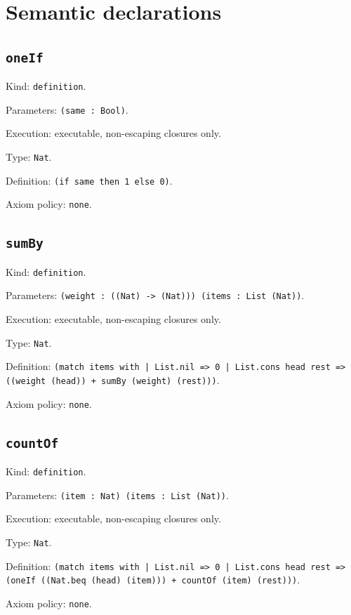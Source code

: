 \documentclass[11pt]{article}
\begin{document}
\section*{Semantic declarations}
\subsection*{\texttt{oneIf}}
\noindent Kind: \texttt{definition}.\par
\noindent Parameters: \texttt{(same : Bool)}.\par
\noindent Execution: executable, non-escaping closures only.\par
\noindent Type: \texttt{Nat}.\par
\noindent Definition: \texttt{(if same then 1 else 0)}.\par
\noindent Axiom policy: \texttt{none}.\par
\subsection*{\texttt{sumBy}}
\noindent Kind: \texttt{definition}.\par
\noindent Parameters: \texttt{(weight : ((Nat) -> (Nat))) (items : List (Nat))}.\par
\noindent Execution: executable, non-escaping closures only.\par
\noindent Type: \texttt{Nat}.\par
\noindent Definition: \texttt{(match items with | List.nil => 0 | List.cons head rest => ((weight (head)) + sumBy (weight) (rest)))}.\par
\noindent Axiom policy: \texttt{none}.\par
\subsection*{\texttt{countOf}}
\noindent Kind: \texttt{definition}.\par
\noindent Parameters: \texttt{(item : Nat) (items : List (Nat))}.\par
\noindent Execution: executable, non-escaping closures only.\par
\noindent Type: \texttt{Nat}.\par
\noindent Definition: \texttt{(match items with | List.nil => 0 | List.cons head rest => (oneIf ((Nat.beq (head) (item))) + countOf (item) (rest)))}.\par
\noindent Axiom policy: \texttt{none}.\par
\end{document}
